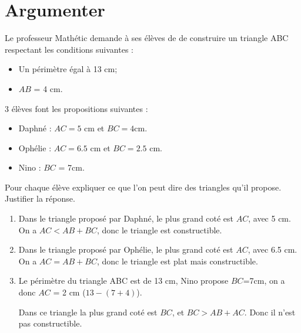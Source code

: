 \section{Argumenter}

Le professeur Mathétic demande à ses élèves de  de construire un triangle ABC respectant les conditions suivantes :

\begin{itemize}
	\item Un périmètre égal à 13 cm;
	\item $AB$ = 4 cm.
\end{itemize}

3 élèves font les propositions suivantes :
\begin{itemize}
	\item Daphné : $AC = 5$ cm et $BC= \num{4}$cm.
	\item Ophélie :  $AC = \num{6.5}$ cm et $BC= \num{2.5}$ cm.
	\item Nino : $BC$ = 7cm.
\end{itemize}

\begin{questions}
	\question Pour chaque élève expliquer ce que l'on peut dire des triangles qu'il propose. Justifier la réponse.
	
	\begin{solution}
		\begin{enumerate}
			\item Dans le triangle proposé par Daphné, le plus grand coté est $AC$, avec 5 cm. On a $AC < AB + BC$, donc le triangle est constructible.
			
			\item Dans le triangle proposé par Ophélie, le plus grand coté est $AC$, avec \num{6.5} cm. On a $AC = AB + BC$, donc le triangle est plat mais constructible.
			
			\item Le périmètre du triangle ABC est de 13 cm, Nino propose $BC$=7cm, on a donc $AC$ = 2 cm ($13 - (7 + 4)$).
			
			Dans ce triangle la plus grand coté est $BC$, et $BC > AB + AC$. Donc il n'est pas constructible.
		\end{enumerate}
	\end{solution}
\end{questions}